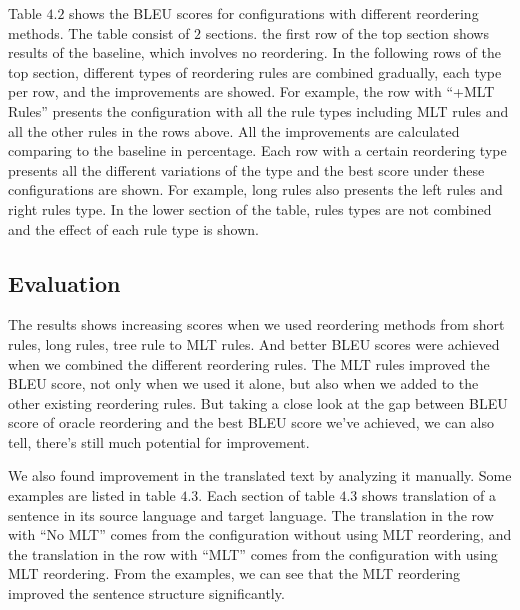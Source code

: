 Table $4.2$ shows the BLEU scores for configurations with different reordering methods. The table consist of $2$ sections. the first row of the top section shows results of the baseline, which involves no reordering. In the following rows of the top section, different types of reordering rules are combined gradually, each type per row, and the improvements are showed. For example, the row with ``+MLT Rules'' presents the configuration with all the rule types including MLT rules and all the other rules in the rows above. All the improvements are calculated comparing to the baseline in percentage. Each row with a certain reordering type presents all the different variations of the type and the best score under these configurations are shown. For example, long rules also presents the left rules and right rules type. In the lower section of the table, rules types are not combined and the effect of each rule type is shown. %

\subsection{Evaluation}

The results shows increasing scores when we used reordering methods from short rules, long rules, tree rule to MLT rules. And better BLEU scores were achieved when we combined the different reordering rules. The MLT rules improved the BLEU score, not only when we used it alone, but also when we added to the other existing reordering rules. But taking a close look at the gap between BLEU score of oracle reordering and the best BLEU score we've achieved, we can also tell, there's still much potential for improvement.

We also found improvement in the translated text by analyzing it manually. Some examples are listed in table $4.3$. Each section of table $4.3$ shows translation of a sentence in its source language and target language. The translation in the row with ``No MLT'' comes from the configuration without using MLT reordering, and the translation in the row with ``MLT'' comes from the configuration with using MLT reordering. From the examples, we can see that the MLT reordering improved the sentence structure significantly.

